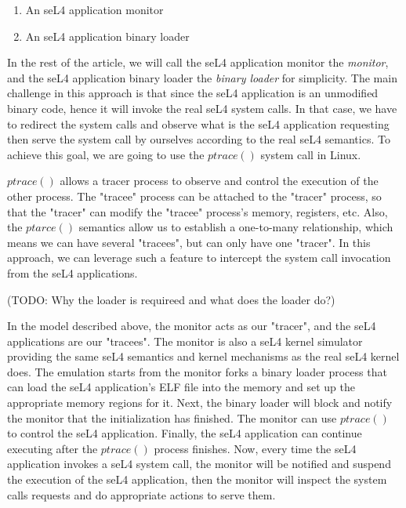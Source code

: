 \begin{enumerate}
    \item An seL4 application monitor
    \item An seL4 application binary loader 
\end{enumerate}

In the rest of the article, we will call the seL4 application monitor the \emph{monitor}, and the seL4 application binary loader the \emph{binary loader} for simplicity. The main challenge in this approach is that since the seL4 application is an unmodified binary code, hence it will invoke the real seL4 system calls. In that case, we have to redirect the system calls and observe what is the seL4 application requesting then serve the system call by ourselves according to the real seL4 semantics. To achieve this goal, we are going to use the $ptrace()$ system call in Linux.

$ptrace()$ allows a tracer process to observe and control the execution of the other process. The "tracee" process can be attached to the "tracer" process, so that the "tracer" can modify the "tracee" process's memory, registers, etc. Also, the $ptarce()$ semantics allow us to establish a one-to-many relationship, which means we can have several "tracees", but can only have one "tracer". In this approach, we can leverage such a feature to intercept the system call invocation from the seL4 applications.

(TODO: Why the loader is requireed and what does the loader do?)

In the model described above, the monitor acts as our "tracer", and the seL4 applications are our "tracees". The monitor is also a seL4 kernel simulator providing the same seL4 semantics and kernel mechanisms as the real seL4 kernel does. The emulation starts from the monitor forks a binary loader process that can load the seL4 application's ELF file into the memory and set up the appropriate memory regions for it. Next, the binary loader will block and notify the monitor that the initialization has finished. The monitor can use $ptrace()$ to control the seL4 application. Finally, the seL4 application can continue executing after the $ptrace()$ process finishes. Now, every time the seL4 application invokes a seL4 system call, the monitor will be notified and suspend the execution of the seL4 application, then the monitor will inspect the system calls requests and do appropriate actions to serve them.

